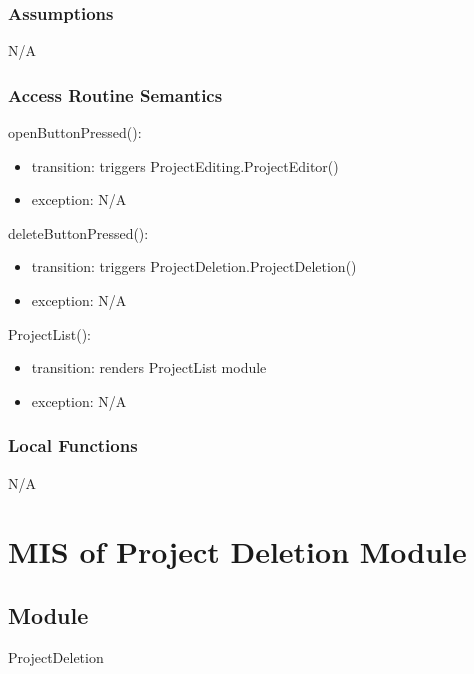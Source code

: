 \documentclass[12pt, titlepage]{article}
\begin{document}
	\subsubsection{Assumptions}
	N/A
	
	\subsubsection{Access Routine Semantics}
	
	\noindent openButtonPressed():
	\begin{itemize}
		\item transition: triggers ProjectEditing.ProjectEditor()
		\item exception: N/A
	\end{itemize}
	
	\noindent deleteButtonPressed():
	\begin{itemize}
		\item transition: triggers ProjectDeletion.ProjectDeletion()
		\item exception: N/A
	\end{itemize}
	
	\noindent ProjectList():
	\begin{itemize}
		\item transition: renders ProjectList module
		\item exception: N/A
	\end{itemize}
	
	\subsubsection{Local Functions}
	
	N/A
	
	\newpage
	
	\section{MIS of Project Deletion Module} \label{Module} 
	
	\subsection{Module}
	
	ProjectDeletion
	
\end{document}
